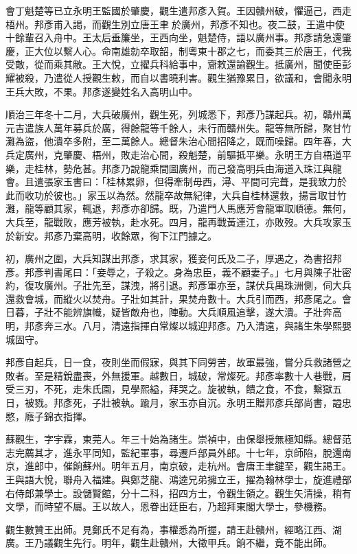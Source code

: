 \begin{pinyinscope}
會丁魁楚等已立永明王監國於肇慶，觀生遣邦彥入賀。王因贛州破，懼逼己，西走梧州。邦彥甫入謁，而觀生別立唐王聿於廣州，邦彥不知也。夜二鼓，王遣中使十餘輩召入舟中。王太后垂簾坐，王西向坐，魁楚侍，語以廣州事。邦彥請急還肇慶，正大位以繫人心。命南雄勍卒取韶，制粵東十郡之七，而委其三於唐王，代我受敵，從而乘其敝。王大悅，立擢兵科給事中，齎敕還諭觀生。抵廣州，聞使臣彭耀被殺，乃遣從人授觀生敕，而自以書曉利害。觀生猶豫累日，欲議和，會聞永明王兵大敗，不果。邦彥遂變姓名入高明山中。

順治三年冬十二月，大兵破廣州，觀生死，列城悉下，邦彥乃謀起兵。初，贛州萬元吉遣族人萬年募兵於廣，得餘龍等千餘人，未行而贛州失。龍等無所歸，聚甘竹灘為盜，他潰卒多附，至二萬餘人。總督朱治心間招降之，既而噪歸。四年春，大兵定廣州，克肇慶、梧州，敗走治心間，殺魁楚，前驅抵平樂。永明王方自梧道平樂，走桂林，勢危甚。邦彥乃說龍乘間圖廣州，而己發高明兵由海道入珠江與龍會。且遣張家玉書曰：「桂林累卵，但得牽制毋西，潯、平間可完葺，是我致力於此而收功於彼也。」家玉以為然。然龍卒故無紀律，大兵自桂林還救，揚言取甘竹灘，龍等顧其家，輒退，邦彥亦卻歸。既，乃遣門人馬應芳會龍軍取順德。無何，大兵至，龍戰敗，應芳被執，赴水死。四月，龍再戰黃連江，亦敗歿。大兵攻家玉於新安。邦彥乃棄高明，收餘眾，徇下江門據之。

初，廣州之圍，大兵知謀出邦彥，求其家，獲妾何氏及二子，厚遇之，為書招邦彥。邦彥判書尾曰：「妾辱之，子殺之。身為忠臣，義不顧妻子。」七月與陳子壯密約，復攻廣州。子壯先至，謀洩，將引退。邦彥軍亦至，謀伏兵禺珠洲側，伺大兵還救會城，而縱火以焚舟。子壯如其計，果焚舟數十。大兵引而西，邦彥尾之。會日暮，子壯不能辨旗幟，疑皆敵舟也，陣動。大兵順風追擊，遂大潰。子壯奔高明，邦彥奔三水。八月，清遠指揮白常燦以城迎邦彥。乃入清遠，與諸生朱學熙嬰城固守。

邦彥自起兵，日一食，夜則坐而假寐，與其下同勞苦，故軍最強，嘗分兵救諸營之敗者。至是精銳盡喪，外無援軍。越數日，城破，常燦死。邦彥率數十人巷戰，肩受三刃，不死，走朱氏園，見學熙縊，拜哭之。旋被執，饋之食，不食，繫獄五日，被戮。邦彥死，子壯被執。踰月，家玉亦自沉。永明王贈邦彥兵部尚書，謚忠愍，廕子錦衣指揮。

蘇觀生，字宇霖，東莞人。年三十始為諸生。崇禎中，由保舉授無極知縣。總督范志完薦其才，進永平同知，監紀軍事，尋遷戶部員外郎。十七年，京師陷，脫還南京，進郎中，催餉蘇州。明年五月，南京破，走杭州。會唐王聿鍵至，觀生謁王。王與語大悅，聯舟入福建。與鄭芝龍、鴻逵兄弟擁立王，擢為翰林學士，旋進禮部右侍郎兼學士。設儲賢館，分十二科，招四方士，令觀生領之。觀生矢清操，稍有文學，而時望不屬。王以故人，恩眷出廷臣右，乃超拜東閣大學士，參機務。

觀生數贊王出師。見鄭氏不足有為，事權悉為所握，請王赴贛州，經略江西、湖廣。王乃議觀生先行。明年，觀生赴贛州，大徵甲兵。餉不繼，竟不能出師。


\end{pinyinscope}
